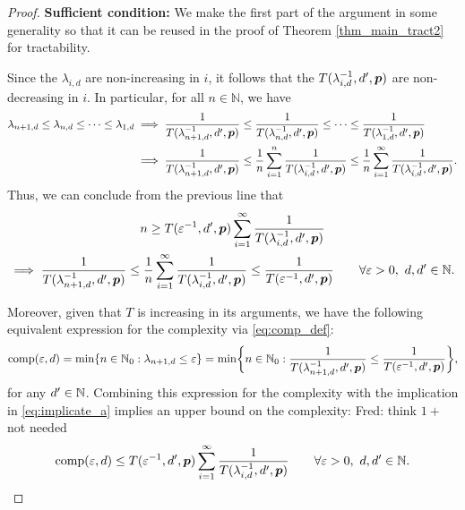 \documentclass[11pt,a4paper]{article}
\newcommand{\fred}[1]{\begingroup\color{blue}Fred: #1\endgroup}
\begin{document}
\begin{proof}
\textbf{Sufficient condition:}\newline
We make the first part of the argument in some generality so that it can be reused in the proof of Theorem \ref{thm_main_tract2} for tractability.

Since the $\lambda_{i,d}$ are non-increasing in $i$, it follows that the $T(\lambda_{i,d}^{-1},d',\boldsymbol{p})$ are non-decreasing in $i$. In particular, for all $n\in \mathbb{N}$, we have
\begin{align*}
    \lambda_{n+1,d} \le \lambda_{n,d} \le \cdots \le \lambda_{1,d}
    & \implies \frac{1}{T(\lambda_{n+1, d}^{-1},d',\boldsymbol{p})} \le \frac{1}{T(\lambda_{n, d}^{-1},d',\boldsymbol{p})} \le \cdots \le \frac{1}{T(\lambda_{1, d}^{-1},d',\boldsymbol{p})} \\
    & \implies \frac{1}{T(\lambda_{n+1, d}^{-1},d',\boldsymbol{p}) }
    \le \frac 1n \sum_{i=1}^n  \frac{1}{T(\lambda_{i, d}^{-1},d',\boldsymbol{p}) }
    \le \frac 1n \sum_{i=1}^\infty  \frac{1}{T(\lambda_{i, d}^{-1},d',\boldsymbol{p})}.
\end{align*}
Thus, we can conclude from the previous line that
\begin{multline} \label{eq:implicate_a}
    n \ge T(\varepsilon^{-1},d',\boldsymbol{p}) \sum_{i=1}^\infty \frac{1}{T(\lambda_{i, d}^{-1},d',\boldsymbol{p})} \\
   \implies   \frac{1}{T(\lambda_{n+1, d}^{-1},d',\boldsymbol{p})} \le
   \frac 1n \sum_{i=1}^\infty \frac{1}{T(\lambda_{i, d}^{-1},d',\boldsymbol{p}) } \le \frac{1}{T(\varepsilon^{-1},d',\boldsymbol{p})} \qquad \forall \varepsilon > 0, \ d,d' \in \mathbb{N}.
\end{multline}

Moreover, given that $T$ is increasing in its arguments, we have the following equivalent expression for the complexity via \eqref{eq:comp_def}:
    \begin{equation*} %
    \comp(\varepsilon, d) = \min \{n \in \natzero : \lambda_{n+1, d} \le \varepsilon\} = \min \biggl\{n \in \natzero : \frac{1}{T(\lambda_{n+1,d}^{-1},d',\vp)}\le \frac{1}{T(\varepsilon^{-1},d',\vp) }\biggr\},
\end{equation*}
for any $d' \in \mathbb{N}$.  Combining this expression for the complexity with the implication in \eqref{eq:implicate_a} implies an upper bound on the complexity: \fred{think $1+$ not needed}
\begin{equation} \label{eq:compUP}
	\operatorname{comp}(\varepsilon,d)
	\le T(\varepsilon^{-1},d',\boldsymbol{p}) \sum_{i=1}^\infty \frac{1}{T(\lambda_{i, d}^{-1},d',\boldsymbol{p})} \qquad \forall \varepsilon > 0, \ d, d' \in \mathbb{N}.
\end{equation}


\end{proof}
\end{document}
